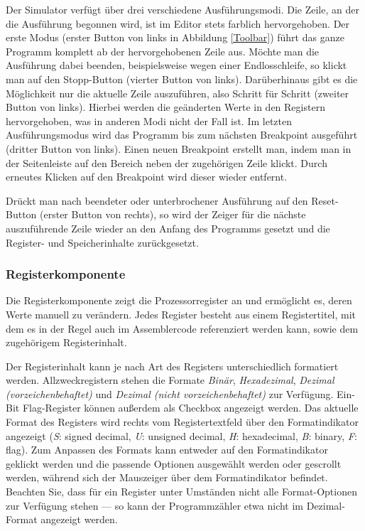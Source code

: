 Der Simulator verfügt über drei verschiedene Ausführungsmodi. Die Zeile, an der
die Ausführung begonnen wird, ist im Editor stets farblich hervorgehoben. Der
erste Modus (erster Button von links in Abbildung \ref{Toolbar}) führt das ganze
Programm komplett ab der hervorgehobenen Zeile aus. Möchte man die Ausführung
dabei beenden, beispielsweise wegen einer Endlosschleife, so klickt man auf den
Stopp-Button (vierter Button von links). Darüberhinaus gibt es die Möglichkeit
nur die aktuelle Zeile auszuführen, also Schritt für Schritt (zweiter Button von
links). Hierbei werden die geänderten Werte in den Registern hervorgehoben, was
in anderen Modi nicht der Fall ist. Im letzten Ausführungsmodus wird das
Programm bis zum nächsten Breakpoint ausgeführt (dritter Button von links).
Einen neuen Breakpoint erstellt man, indem man in der Seitenleiste auf den
Bereich neben der zugehörigen Zeile klickt. Durch erneutes Klicken auf den
Breakpoint wird dieser wieder entfernt.

Drückt man nach beendeter oder unterbrochener Ausführung auf den Reset-Button
(erster Button von rechts), so wird der Zeiger für die nächste auszuführende
Zeile wieder an den Anfang des Programms gesetzt und die Register- und
Speicherinhalte zurückgesetzt.


\subsubsection{Registerkomponente}
Die Registerkomponente zeigt die
Prozessorregister an und ermöglicht es, deren Werte manuell zu verändern. Jedes
Register besteht aus einem Registertitel, mit dem es in der Regel auch im
Assemblercode referenziert werden kann, sowie dem zugehörigem Registerinhalt.

Der Registerinhalt kann je nach Art des Registers unterschiedlich formatiert
werden. Allzweckregistern stehen die Formate \emph{Binär},
\emph{Hexadezimal}, \emph{Dezimal (vorzeichenbehaftet)} und \emph{Dezimal
(nicht vorzeichenbehaftet)} zur Verfügung. Ein-Bit Flag-Register können außerdem
als Checkbox angezeigt werden. Das aktuelle Format des Registers wird rechts vom
Registertextfeld über den Formatindikator angezeigt (\emph{S}: signed decimal,
\emph{U}: unsigned decimal, \emph{H}: hexadecimal, \emph{B}: binary,
\emph{F}: flag). Zum Anpassen des Formats kann entweder auf den
Formatindikator geklickt werden und die passende Optionen ausgewählt werden oder
gescrollt werden, während sich der Mauszeiger über dem Formatindikator befindet.
Beachten Sie, dass für ein Register unter Umständen nicht alle Format-Optionen
zur Verfügung stehen --- so kann der Programmzähler etwa nicht im Dezimal-Format
angezeigt werden.

